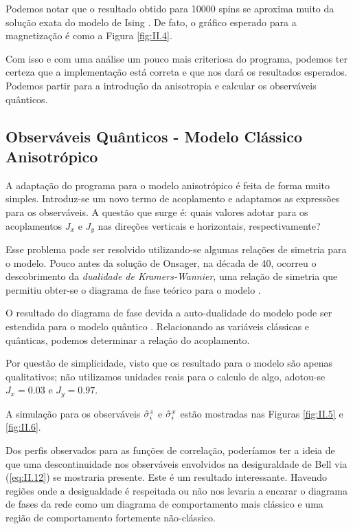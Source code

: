 Podemos notar que o resultado obtido para 10000 spins se aproxima muito da solução exata do modelo de Ising \cite{Baxter, Huang}. De fato, o gráfico esperado para a magnetização é como a Figura \ref{fig:II.4}.  



Com isso e com uma análise um pouco mais criteriosa do programa, podemos ter certeza que a implementação está correta e que nos dará os resultados esperados. Podemos partir para a introdução da anisotropia e calcular os observáveis quânticos.



\subsection{Observáveis Quânticos - Modelo Clássico Anisotrópico}
\label{subsec:ObservaveisQuanticosModeloAnisotropico}

A adaptação do programa para o modelo anisotrópico é feita de forma muito simples. Introduz-se um novo termo de acoplamento e adaptamos as expressões para os observáveis. A questão que surge é: quais valores adotar para os acoplamentos $J_x$ e $J_y$ nas direções verticais e horizontais, respectivamente? 

Esse problema pode ser resolvido utilizando-se algumas relações de simetria para o modelo. Pouco antes da solução de Onsager, na década de 40, ocorreu o descobrimento da \textit{dualidade de Kramers-Wannier}, uma relação de simetria que permitiu obter-se o diagrama de fase teórico para o modelo \cite{Kramers-1941I, Kramers-1941II}. 

O resultado do diagrama de fase devida a auto-dualidade do modelo pode ser estendida para o modelo quântico \cite{KogutMain}. Relacionando as variáveis clássicas e quânticas, podemos determinar a relação do acoplamento. 

Por questão de simplicidade, visto que os resultado para o modelo são apenas qualitativos; não utilizamos unidades reais para o calculo de algo, adotou-se $J_x = 0.03$ e $J_y = 0.97$. 



A simulação para os observáveis $\hat{\sigma}^z_i$ e $\hat{\sigma}^x_i$ estão mostradas nas Figuras \ref{fig:II.5} e \ref{fig:II.6}. 


Dos perfis observados para as funções de correlação, poderíamos ter a ideia de que uma descontinuidade nos observáveis envolvidos na desiguraldade de Bell via (\ref{eq:II.12}) se mostraria presente. Este é um resultado interessante. Havendo regiões onde a desigualdade é respeitada ou não nos levaria a encarar o diagrama de fases da rede como um diagrama de comportamento mais clássico e uma região de comportamento fortemente não-clássico. 

